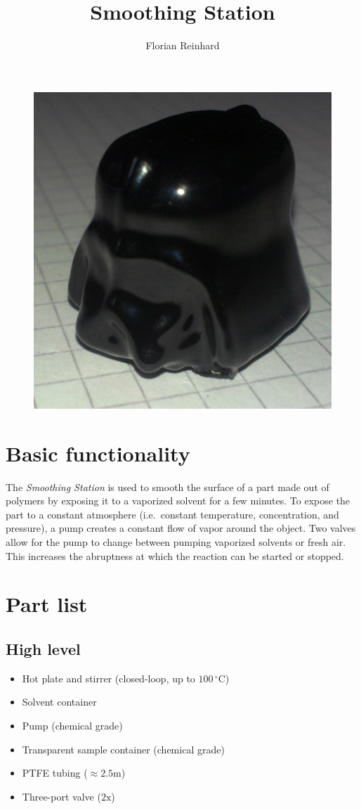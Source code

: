\documentclass[a4paper, 12pt]{paper}
\author{Florian Reinhard}
\begin{document}
\title{Smoothing Station}
\maketitle

\begin{figure}[h]
    \centering
    \includegraphics[width=0.6\linewidth]{vader.jpg}
\label{fig:title}
\end{figure}

\section{Basic functionality}
The \emph{Smoothing Station} is used to smooth the surface of a part made out
of polymers by exposing it to a vaporized solvent for a few minutes.
To expose the part to a constant atmosphere (i.e.\ constant temperature,
concentration, and pressure), a pump creates a constant flow of vapor around
the object. Two valves allow for the pump to change between pumping vaporized
solvents or fresh air. This increases the abruptness at which the reaction can
be started or stopped.

\section{Part list}

\subsection{High level}
\begin{itemize}
    \item Hot plate and stirrer (closed-loop, up to $100\,^{\circ}\mathrm{C}$)
    \item Solvent container
    \item Pump (chemical grade)
    \item Transparent sample container (chemical grade)
    \item PTFE tubing ($\approx2.5\mathrm{m}$)
    \item Three-port valve ($\mathrm{2x}$)
\end{itemize}
\end{document}
